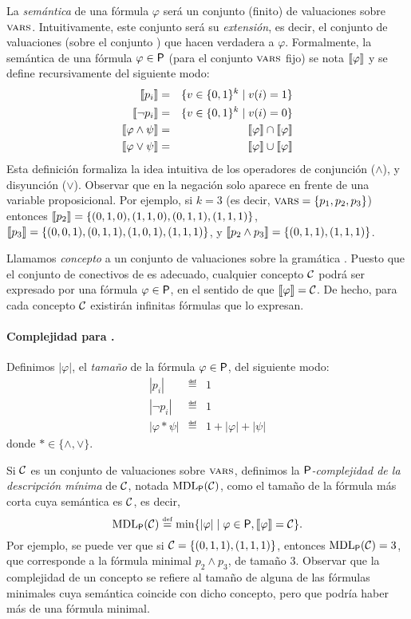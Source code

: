 La {\em semántica} de una fórmula $\varphi$ será un conjunto (finito) de valuaciones sobre $\textsc{vars}$. Intuitivamente, este conjunto será su {\em extensión}, es decir, el conjunto de valuaciones (sobre el conjunto \propvars) que hacen verdadera a $\varphi$. 
%
Formalmente, la semántica de una fórmula $\varphi\in{\sf P}$ (para el conjunto $\textsc{vars}$ fijo) se nota $\llbracket \varphi\rrbracket$ y se define recursivamente del siguiente modo:
%
\begin{eqnarray*}
\llbracket p_i\rrbracket &=& \{ v\in\{0,1\}^k \mid v(i)=1\}\\
\llbracket \lnot p_i\rrbracket &=& \{ v\in\{0,1\}^k \mid v(i)=0\}\\
\llbracket \varphi\wedge\psi\rrbracket &=& \llbracket \varphi\rrbracket\cap\llbracket \varphi\rrbracket\\
\llbracket \varphi\vee\psi\rrbracket &=& \llbracket \varphi\rrbracket\cup\llbracket \varphi\rrbracket
\end{eqnarray*}
Esta definición formaliza la idea intuitiva de los operadores de conjunción ($\wedge$), y disyunción ($\vee$). Observar que en \grambool la negación solo aparece en frente de una variable proposicional. Por ejemplo, si $k=3$ (es decir, $\textsc{vars}=\{p_1,p_2,p_3\}$) entonces $\llbracket p_2\rrbracket=\{(0,1,0), (1,1,0), (0,1,1), (1,1,1)\}$,  $\llbracket p_3\rrbracket=\{(0,0,1), (0,1,1), (1,0,1), (1,1,1)\}$, y $\llbracket p_2\wedge p_3\rrbracket=\{(0,1,1), (1,1,1)\}$.

Llamamos {\em concepto} a un conjunto de valuaciones sobre la gramática \grambool. Puesto que el conjunto de conectivos de \grambool es adecuado, cualquier concepto $\mathcal{C}$ podrá ser expresado por una fórmula $\varphi\in{\sf P}$, en el sentido de que $\llbracket \varphi\rrbracket=\mathcal{C}$. De hecho, para cada concepto $\mathcal{C}$ existirán infinitas fórmulas que lo expresan.

\paragraph{Complejidad para \grambool.} Definimos $|\varphi|$, el {\em tamaño} de la fórmula $\varphi\in{\sf P}$, del siguiente modo:
\begin{eqnarray*}
|p_i| &\eqdef& 1\\
|\lnot p_i| &\eqdef& 1\\
|\varphi*\psi| &\eqdef& 1+|\varphi|+|\psi|
\end{eqnarray*}
donde $*\in\{\wedge,\vee\}$.

Si $\mathcal{C}$ es un conjunto de valuaciones sobre $\textsc{vars}$, definimos la {\em ${\sf P}$-complejidad de la descripción mínima} de $\mathcal{C}$, notada ${\rm MDL}_{{\sf P}}(\mathcal{C})$, como el tamaño de la fórmula más corta cuya semántica es $\mathcal{C}$, es decir,
$$
{\rm MDL}_{{\sf P}}(\mathcal{C})\stackrel{\scriptscriptstyle \mathrm{def}}{=}\min\{|\varphi|\mid \varphi\in{\sf P},\llbracket \varphi\rrbracket=\mathcal{C}\}.
$$
Por ejemplo, se puede ver que si $\mathcal{C}=\{(0,1,1), (1,1,1)\}$, entonces ${\rm MDL}_{{\sf P}}(\mathcal{C})=3$, que corresponde a la fórmula minimal $p_2\wedge p_3$, de tamaño 3. Observar que la complejidad de un concepto se refiere al tamaño de alguna de las fórmulas minimales cuya semántica coincide con dicho concepto, pero que podría haber más de una fórmula minimal.


    \color{black}